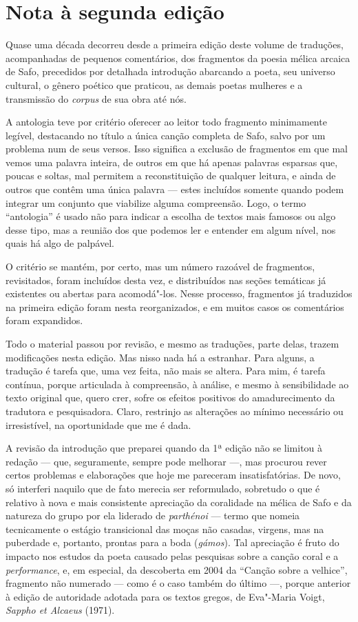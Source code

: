 \chapter{Nota à segunda edição}

Quase uma década decorreu desde a primeira edição deste volume de traduções,
acompanhadas de pequenos comentários, dos fragmentos da poesia mélica
arcaica de Safo, precedidos por detalhada introdução abarcando a poeta, seu
universo cultural, o gênero poético que praticou, as demais poetas
mulheres e a transmissão do \emph{corpus} de sua obra até nós.

A antologia teve por critério oferecer ao leitor todo fragmento
minimamente legível, destacando no título a única canção completa de Safo, salvo por um problema num de seus versos. Isso significa a exclusão de fragmentos em que mal
vemos uma palavra inteira, de outros em que há apenas
palavras esparsas que, poucas e soltas, mal permitem a reconstituição de
qualquer leitura, e ainda de outros que contêm uma única palavra ---
estes incluídos somente quando podem integrar um conjunto que viabilize
alguma compreensão. Logo, o termo ``antologia'' é usado não para indicar a escolha de textos mais famosos ou algo desse
tipo, mas a reunião dos que podemos ler e entender
em algum nível, nos quais há algo de palpável.

O critério se mantém, por certo, mas um número razoável de fragmentos, revisitados,
foram incluídos desta vez, e distribuídos nas seções temáticas já
existentes ou abertas para acomodá"-los. Nesse processo, fragmentos já traduzidos na primeira edição foram nesta reorganizados, e em muitos casos os comentários foram expandidos.

Todo o material passou por revisão, e mesmo as traduções, parte delas,
trazem modificações nesta edição. Mas nisso nada há a estranhar. Para alguns, a
tradução é tarefa que, uma vez feita, não mais se altera. Para mim,
é tarefa contínua, porque articulada à compreensão, à análise,
e mesmo à sensibilidade ao texto original que, quero crer, sofre os
efeitos positivos do amadurecimento da tradutora e pesquisadora. Claro, restrinjo as
alterações ao mínimo necessário ou irresistível, na oportunidade que
me é dada.

A revisão da introdução que preparei quando da 1ª edição não
se limitou à redação --- que, seguramente, sempre pode melhorar ---, mas
procurou rever certos problemas e elaborações que hoje me pareceram
insatisfatórias. De novo, só interferi naquilo que de fato merecia ser
reformulado, sobretudo o que é relativo à nova e mais consistente
apreciação da coralidade na mélica de Safo e da natureza do grupo por
ela liderado de \emph{parthénoi} --- termo que nomeia tecnicamente o
estágio transicional das moças não casadas, virgens, mas na puberdade
e, portanto, prontas para a boda (\emph{gámos}). Tal apreciação é fruto
do impacto nos estudos da poeta causado pelas pesquisas sobre a canção
coral e a \emph{performance}, e, em especial, da descoberta em 2004
da ``Canção sobre a velhice'', fragmento não numerado --- como é o caso também do último ---, porque anterior à edição de autoridade adotada para os textos gregos, de Eva"-Maria Voigt, \textit{Sappho et Alcaeus} (1971).


